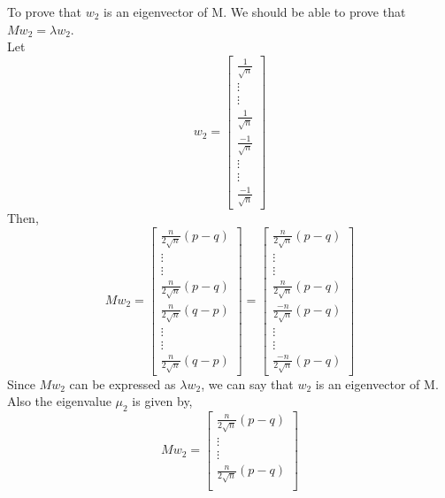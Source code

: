 \documentclass[10pt]{article}
\begin{document}
\begin{flushleft}
To prove that $w_{2}$ is an eigenvector of M. We should be able to prove that $Mw_{2} = \lambda w_{2}$. \\
\vspace{0.5em}
Let $$ w_{2} = 
\begin{bmatrix}
\frac{1}{\sqrt n}\\
\vdots\\
\vdots\\
\frac{1}{\sqrt n}\\
\frac{-1}{\sqrt n}\\
\vdots\\
\vdots\\
\frac{-1}{\sqrt n}
\end{bmatrix}
$$
Then, \\
\vspace{0.5em}
$$ Mw_{2} = 
\begin{bmatrix}
\frac{n}{2 \sqrt n} (p-q)\\
\vdots\\
\vdots\\
\frac{n}{2 \sqrt n} (p-q)\\
\frac{n}{2 \sqrt n} (q-p)\\
\vdots\\
\vdots\\
\frac{n}{2 \sqrt n} (q-p)
\end{bmatrix}
= 
\begin{bmatrix}
\frac{n}{2 \sqrt n} (p-q)\\
\vdots\\
\vdots\\
\frac{n}{2 \sqrt n} (p-q)\\
\frac{-n}{2 \sqrt n} (p-q)\\
\vdots\\
\vdots\\
\frac{-n}{2 \sqrt n} (p-q)
\end{bmatrix}
$$
Since $Mw_{2}$ can be expressed as $\lambda w_{2}$, we can say that $w_{2}$ is an eigenvector of M. \\
\vspace{0.5em}
Also the eigenvalue $\mu_{2}$ is given by,\\
\vspace{0.5em}
$$ Mw_{2} = 
\begin{bmatrix}
\frac{n}{2 \sqrt n} (p-q)\\
\vdots\\
\vdots\\
\frac{n}{2 \sqrt n} (p-q)\\

\end{bmatrix}$$
\end{flushleft}
\end{document}
